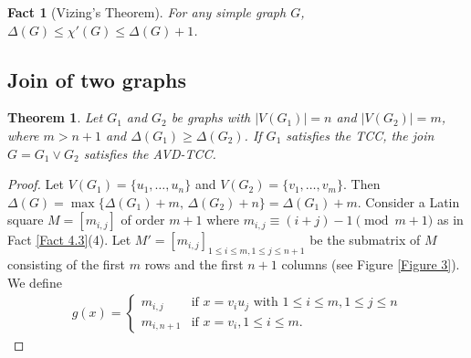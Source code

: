 \documentclass[12pt,reqno,a4paper]{amsart}
\theoremstyle{definition}
\theoremstyle{plain}
\newtheorem{thm}[defn]{Theorem}
\newtheorem{fact}[defn]{Fact}
\begin{document}
\begin{fact}[Vizing's Theorem]\label{Fact 4.4}
For any simple graph $G$, $\Delta(G)\leq \chi'(G) \leq \Delta(G)+1$.
\end{fact}

\subsection{Join of two graphs}

\begin{thm}\label{Theorem 4.5}
Let $G_1$ and $G_2$ be graphs with $|V(G_1)|=n$ and $|V(G_2)|=m$, where $m>n+1$ and $\Delta(G_1)\geq\Delta(G_2)$. If $G_1$ satisfies the TCC, the join $G=G_1\vee G_2$ satisfies the AVD-TCC.
\end{thm}

\begin{proof}
Let $V(G_1)=\{u_1,\dots,u_n\}$ and $V(G_2)=\{v_1,\dots,v_m\}$. 
Then $\Delta(G)=\max\{\Delta(G_1)+m,\,\Delta(G_2)+n\}=\Delta(G_1)+m$.
Consider a Latin square $M=[m_{i,j}]$ of order $m+1$ where $m_{i,j}\equiv (i+j)-1 \pmod{m+1}$
as in Fact \ref{Fact 4.3}(4). 
Let $M'=[m_{i,j}]_{1\leq i\leq m,1\leq j\leq n+1}$ be the submatrix of $M$ consisting of the first $m$ rows and the first $n+1$ columns (see Figure \ref{Figure 3}).
We define
\begin{align*}
g(x)=
\begin{cases}
m_{i,j} & \text{if } x=v_iu_j \text{ with }  1\leq i \leq m, 1\leq j \leq n \\[2mm]
m_{i,n+1} & \text{if } x=v_i, 1\leq i \leq m.
\end{cases}
\end{align*}



\end{proof}
\end{document}

